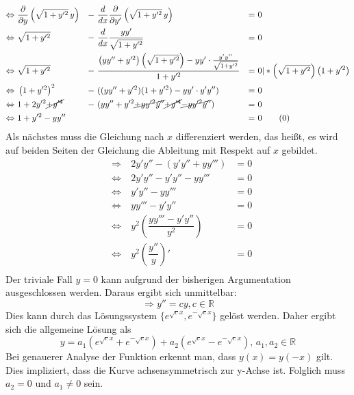 \begin{align*}
	\Leftrightarrow &\
	\frac{\partial}{\partial y} \left( \sqrt{1 + y'^2} \, y \right) &- &\ \frac{d}{dx} \frac{\partial}{\partial y'} \left( \sqrt{1 + y'^2} \, y \right) 
	&= &\
	0
	\\
	\Leftrightarrow &\
	\sqrt{1 + y'^2} &- &\ \frac{d}{dx} \dfrac{yy'}{\sqrt{1 + y'^2}}
	&= &\
	0
	\\
	\Leftrightarrow &\
	\sqrt{1 + y'^2} &- &\ \frac{\left( y y'' + y'^2 \right) \left( \sqrt{1 + y'^2} \right) - y y' \cdot \frac{y' y''}{\sqrt{1 + y'^2}}}{1 + y'^2}
	&= &\
	0 | * \left(\sqrt{1 + y'^2}\right)\left(1 + y'^2\right)
	\\
	\Leftrightarrow &\
	\left(1 + y'^2\right)^2 &- &\ ((y y'' + y'^2)(1 + y'^2) - y y' \cdot y' y'')
	&= &\
	0
	\\
	\Leftrightarrow &\
	1 + 2y'^2 \cancel{+y'^4} &- &\ (y y'' + y'^2 \cancel{+ yy'^2 y''} \cancel{+ y'^4} \cancel{- yy'^2 y''})
	&= &\
	0
	\\
	\Leftrightarrow &\
	1 + y'^2 - yy'' & &\
	&= &\
	0 \label{kettenlinie:equation_1} \tag{\theequation} \stepcounter{equation}
\end{align*}
Als nächstes muss die Gleichung nach \(x\) differenziert werden, das heißt, es wird auf beiden Seiten der Gleichung die Ableitung mit Respekt auf \(x\) gebildet.
\begin{align*}
	&\Rightarrow &\
	2y'y'' - (y'y'' + yy''')
	&=
	0
	\\
	&\Leftrightarrow &\
	2y'y'' - y'y'' - yy'''
	&=
	0
	\\
	&\Leftrightarrow &\
	y'y'' - yy'''
	&=
	0
	\\
	&\Leftrightarrow &\
	yy''' - y'y''
	&=
	0
	\\
	&\Leftrightarrow &\
	y^2 \left(\dfrac{yy''' - y'y''}{y^2}\right)
	&=
	0
	\\
	&\Leftrightarrow &\
	y^2 \left(\dfrac{y''}{y}\right)'
	&=
	0
	\\
\end{align*}
Der triviale Fall \(y = 0\) kann aufgrund der bisherigen Argumentation ausgeschlossen werden.
Daraus ergibt sich unmittelbar:
\[
	\Rightarrow
	y''
	=
	cy
	, c \in \mathbb{R}
\]
Dies kann durch das Lösungssystem \(\{ e^{\sqrt{c}x}, e^{-\sqrt{c}x} \}\) gelöst werden.
Daher ergibt sich die allgemeine Lösung als
\[
	y
	=
	a_1\left(e^{\sqrt{c}x} + e^{-\sqrt{c}x}\right) + a_2\left(e^{\sqrt{c}x} - e^{-\sqrt{c}x}\right), \, a_1, a_2 \in \mathbb{R}
\]
Bei genauerer Analyse der Funktion erkennt man, dass \(y(x) = y(-x) \) gilt.
Dies impliziert, dass die Kurve achsensymmetrisch zur y-Achse ist.
Folglich muss \(a_2 = 0\) und \(a_1 \neq 0\) sein.

